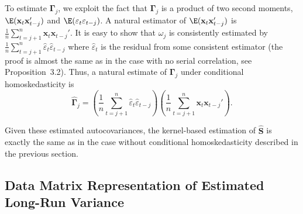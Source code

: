To estimate $\bm{\Gamma}_j$, we exploit the fact that $\bm{\Gamma}_j$ is a product of two second moments,
$\E(\mathbf{x}_t \mathbf{x}_{t-j}')$ and $\E(\varepsilon_t \varepsilon_{t-j})$. A natural estimator of $\E(\mathbf{x}_t \mathbf{x}_{t-j}')$ is $\frac{1}{n} \sum_{t=j+1}^{n} \mathbf{x}_t \mathbf{x}_{t-j}'$. It
is easy to show that $\omega_j$ is consistently estimated by $\frac{1}{n} \sum_{t=j+1}^{n} \hat{\varepsilon}_t \hat{\varepsilon}_{t-j}$ where $\hat{\varepsilon}_t$ is
the residual from some consistent estimator (the proof is almost the same as in the
case with no serial correlation, see Proposition~3.2). Thus, a natural estimate of $\bm{\Gamma}_j$
under conditional homoskedasticity is
\begin{equation}
  \hat{\bm{\Gamma}}_j = \left(\frac{1}{n} \sum_{t=j+1}^{n} \hat{\varepsilon}_t \hat{\varepsilon}_{t-j}\right)
  \left(\frac{1}{n} \sum_{t=j+1}^{n} \mathbf{x}_t \mathbf{x}_{t-j}'\right).
  \label{eq:6.7.4}
\end{equation}

Given these estimated autocovariances, the kernel-based estimation of $\hat{\mathbf{S}}$ is exactly
the same as in the case without conditional homoskedasticity described in the previous
section.

\subsection*{Data Matrix Representation of Estimated Long-Run Variance}


